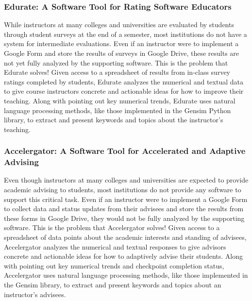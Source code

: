 \documentclass[11pt]{article}
\begin{document}
\subsubsection*{Edurate: A Software Tool for Rating Software Educators}

While instructors at many colleges and universities are evaluated by students through student surveys at the end of a
semester, most institutions do not have a system for intermediate evaluations. Even if an instructor were to implement a
Google Form and store the results of surveys in Google Drive, these results are not yet fully analyzed by the supporting
software. This is the problem that Edurate solves! Given access to a spreadsheet of results from in-class survey ratings
completed by students, Edurate analyzes the numerical and textual data to give course instructors concrete and
actionable ideas for how to improve their teaching. Along with pointing out key numerical trends, Edurate uses natural
language processing methods, like those implemented in the Gensim Python library, to extract and present keywords and
topics about the instructor's teaching.

\vspace*{-.5em}

\subsubsection*{Accelergator: A Software Tool for Accelerated and Adaptive Advising}

Even though instructors at many colleges and universities are expected to provide academic advising to students, most
institutions do not provide any software to support this critical task. Even if an instructor were to implement a Google
Form to collect data and status updates from their advisees and store the results from these forms in Google Drive, they
would not be fully analyzed by the supporting software. This is the problem that Accelergator solves! Given access to a
spreadsheet of data points about the academic interests and standing of advisees, Accelergator analyzes the numerical
and textual responses to give advisors concrete and actionable ideas for how to adaptively advise their students. Along
with pointing out key numerical trends and checkpoint completion status, Accelergator uses natural language processing
methods, like those implemented in the Gensim library, to extract and present keywords and topics about an instructor's
advisees.

\vspace*{.25em}
\end{document}
